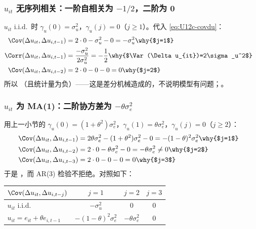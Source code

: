 \subsubsection{\texorpdfstring{$u_{it}$}{u} 无序列相关：一阶自相关为 \texorpdfstring{$-1/2$}{-1/2}，二阶为 0}

$u_{it}$ i.i.d.\ 时 $\gamma_u(0)=\sigma_u^2$，$\gamma_u(j)=0$（$j\ge1$）。代入 \eqref{eq:U12c-covdu}：
\begin{align*}
\Cov(\Delta u_{it},\Delta u_{i,t-1}) &= 2\cdot0-\sigma_u^2-0=-\sigma_u^2 \why{$j=1$}\\
\Corr(\Delta u_{it},\Delta u_{i,t-1}) &= \frac{-\sigma_u^2}{2\sigma_u^2}=-\frac12 \why{$\Var(\Delta u_{it})=2\sigma_u^2$}\\
\Cov(\Delta u_{it},\Delta u_{i,t-2}) &= 2\cdot0-0-0=0 \why{$j=2$}
\end{align*}
所以 （且统计量为负）——这是差分机械造成的，不说明模型有问题；。

\subsubsection{\texorpdfstring{$u_{it}$}{u} 为 MA(1)：二阶协方差为 \texorpdfstring{$-\theta\sigma_e^2$}{-theta sigma\_e\^2}}

用上一小节的 $\gamma_u(0)=(1+\theta^2)\sigma_e^2$，$\gamma_u(1)=\theta\sigma_e^2$，$\gamma_u(j)=0$（$j\ge2$）：
\begin{align*}
\Cov(\Delta u_{it},\Delta u_{i,t-1}) &= 2\theta\sigma_e^2-(1+\theta^2)\sigma_e^2-0=-(1-\theta)^2\sigma_e^2 \why{$j=1$}\\
\Cov(\Delta u_{it},\Delta u_{i,t-2}) &= 2\cdot0-\theta\sigma_e^2-0=-\theta\sigma_e^2\neq0 \why{$j=2$}\\
\Cov(\Delta u_{it},\Delta u_{i,t-3}) &= 2\cdot0-0-0=0 \why{$j=3$}
\end{align*}
于是 ，而 AR(3) 检验不拒绝。对照如下：
\begin{center}
\small
\begin{tabular}{lccc}
\toprule
$\Cov(\Delta u_{it},\Delta u_{i,t-j})$ & $j=1$ & $j=2$ & $j=3$\\
\midrule
$u_{it}$ i.i.d. & $-\sigma_u^2$ & $0$ & $0$\\
$u_{it}=e_{it}+\theta e_{i,t-1}$ & $-(1-\theta)^2\sigma_e^2$ & $-\theta\sigma_e^2$ & $0$\\
\bottomrule
\end{tabular}
\label{tab:U12c-acov}
\end{center}

